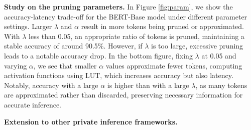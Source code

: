 \noindent\textbf{Study on the pruning parameters.} In Figure \ref{fig:param}, we show the accuracy-latency trade-off for the BERT-Base model under different parameter settings. Larger 
$\lambda$ and $\alpha$ result in more tokens being pruned or approximated. With $\lambda$ less than 0.05, an appropriate ratio of tokens is pruned, maintaining a stable accuracy of around 90.5\%. However, if $\lambda$ is too large, excessive pruning leads to a notable accuracy drop. In the bottom figure, fixing $\lambda$ at 0.05 and varying $\alpha$, we see that smaller $\alpha$ values approximate fewer tokens, computing activation functions using LUT, which increases accuracy but also latency. Notably, accuracy with a large $\alpha$ is higher than with a large $\lambda$, as many tokens are approximated rather than discarded, preserving necessary information for accurate inference.

\noindent\textbf{Extension to other private inference frameworks.} 







